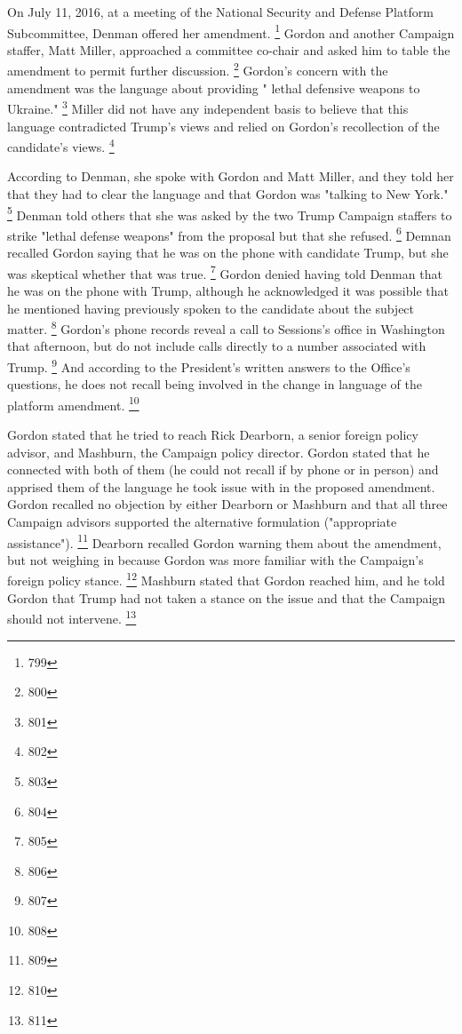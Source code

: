 On July 11, 2016, at a meeting of the National Security and Defense Platform Subcommittee, Denman offered her amendment.%
\footnote{799}
Gordon and another Campaign staffer, Matt Miller, approached a committee co-chair and asked him to table the amendment to permit further discussion.%
\footnote{800}
Gordon's concern with the amendment was the language about providing " lethal defensive weapons to Ukraine."%
\footnote{801}
Miller did not have any independent basis to believe that this language contradicted Trump's views and relied on Gordon's recollection of the candidate's views.%
\footnote{802}

According to Denman, she spoke with Gordon and Matt Miller, and they told her that they had to clear the language and that Gordon was "talking to New York."%
\footnote{803}
Denman told others that she was asked by the two Trump Campaign staffers to strike "lethal defense weapons" from the proposal but that she refused.%
\footnote{804}
Demnan recalled Gordon saying that he was on the phone with candidate Trump, but she was skeptical whether that was true.%
\footnote{805}
Gordon denied having told Denman that he was on the phone with Trump, although he acknowledged it was possible that he mentioned having previously spoken to the candidate about the subject matter.%
\footnote{806}
Gordon's phone records reveal a call to Sessions's office in Washington that afternoon, but do not include calls directly to a number associated with Trump.%
\footnote{807}
And according to the President's written answers to the Office's questions, he does not recall being involved in the change in language of the platform amendment.%
\footnote{808}

Gordon stated that he tried to reach Rick Dearborn, a senior foreign policy advisor, and Mashburn, the Campaign policy director.
Gordon stated that he connected with both of them (he could not recall if by phone or in person) and apprised them of the language he took issue with in the proposed amendment.
Gordon recalled no objection by either Dearborn or Mashburn and that all three Campaign advisors supported the alternative formulation ("appropriate assistance").%
\footnote{809}
Dearborn recalled Gordon warning them about the amendment, but not weighing in because Gordon was more familiar with the Campaign's foreign policy stance.%
\footnote{810}
Mashburn stated that Gordon reached him, and he told Gordon that Trump had not taken a stance on the issue and that the Campaign should not intervene.%
\footnote{811}

